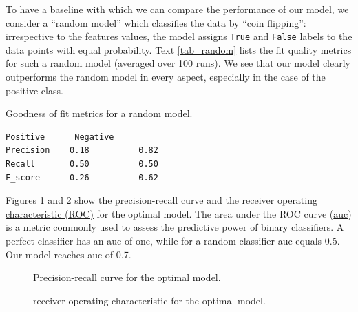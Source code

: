 \documentclass[10pt,parskip=half,
toc=sectionentrywithdots,
bibliography=totocnumbered,
captions=tableheading,numbers=noendperiod]{scrartcl}
\begin{document}
To have a baseline with which we can compare the performance of our
model, we consider a ``random model'' which classifies the data by
``coin flipping'': irrespective to the features values, the model
assigns \texttt{True} and \texttt{False} labels to the data points with
equal probability. Text \ref{tab_random} lists the fit quality metrics
for such a random model (averaged over 100 runs). We see that our model
clearly outperforms the random model in every aspect, especially in the
case of the positive class.

\begin{textcell}[H]
\caption{Goodness of fit metrics for a random model.}
\label{tab_random}
\begin{lstlisting}[aboveskip=5pt,basicstyle=\small,belowskip=5pt,breakindent=0pt,language={},numbers=none,postbreak={},xrightmargin=7pt]
           Positive      Negative
Precision    0.18          0.82
Recall       0.50          0.50
F_score      0.26          0.62

\end{lstlisting}\end{textcell}

Figures \ref{fig_pr} and \ref{fig_roc} show the
\href{https://acutecaretesting.org/en/articles/precision-recall-curves-what-are-they-and-how-are-they-used}{precision-recall
curve} and the
\href{https://en.wikipedia.org/wiki/Receiver_operating_characteristic}{receiver
operating characteristic (ROC)} for the optimal model. The area under
the ROC curve
(\href{https://towardsdatascience.com/understanding-auc-roc-curve-68b2303cc9c5}{auc})
is a metric commonly used to assess the predictive power of binary
classifiers. A perfect classifier has an auc of one, while for a random
classifier auc equals 0.5. Our model reaches auc of 0.7.

\begin{figure}[H]\begin{center}\end{center}\caption{Precision-recall curve for the optimal model.}\label{fig_pr}\end{figure}

\begin{figure}[H]\begin{center}\end{center}\caption{receiver operating characteristic for the optimal model.}\label{fig_roc}\end{figure}
\end{document}

